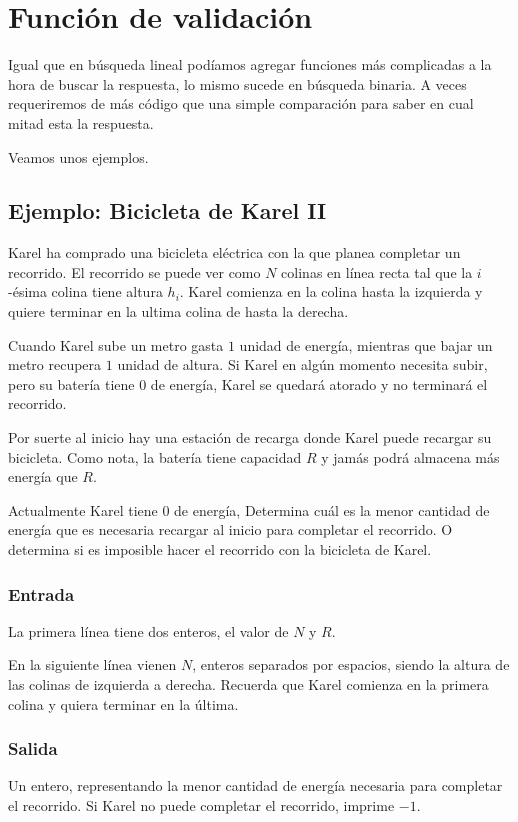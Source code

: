 \section{Función de validación}
Igual que en búsqueda lineal podíamos agregar funciones más complicadas a la hora de buscar la respuesta, lo mismo sucede en búsqueda binaria. A veces requeriremos de más código que una simple comparación para saber en cual mitad esta la respuesta.

Veamos unos ejemplos.


\subsection{Ejemplo: Bicicleta de Karel II}
Karel ha comprado una bicicleta eléctrica con la que planea completar un recorrido. El recorrido se puede ver como \(N\) colinas en línea recta tal que la \(i\)-ésima colina tiene altura \(h_i\). Karel comienza en la colina hasta la izquierda y quiere terminar en la ultima colina de hasta la derecha.

Cuando Karel sube un metro gasta \(1\) unidad de energía, mientras que bajar un metro recupera \(1\) unidad de altura. Si Karel en algún momento necesita subir, pero su batería tiene 0 de energía, Karel se quedará atorado y no terminará el recorrido.

Por suerte al inicio hay una estación de recarga donde Karel puede recargar su bicicleta. Como nota, la batería tiene capacidad \(R\) y jamás podrá almacena más energía que \(R\).

Actualmente Karel tiene \(0\) de energía, Determina cuál es la menor cantidad de energía que es necesaria recargar al inicio para completar el recorrido. O determina si es imposible hacer el recorrido con la bicicleta de Karel.

\subsubsection*{Entrada}
La primera línea tiene dos enteros, el valor de \(N\) y \(R\).

En la siguiente línea vienen \(N\), enteros separados por espacios, siendo la altura de las colinas de izquierda a derecha. Recuerda que Karel comienza en la primera colina y quiera terminar en la última.
\subsubsection*{Salida}
Un entero, representando la menor cantidad de energía necesaria para completar el recorrido. Si Karel no puede completar el recorrido, imprime \(-1\).

